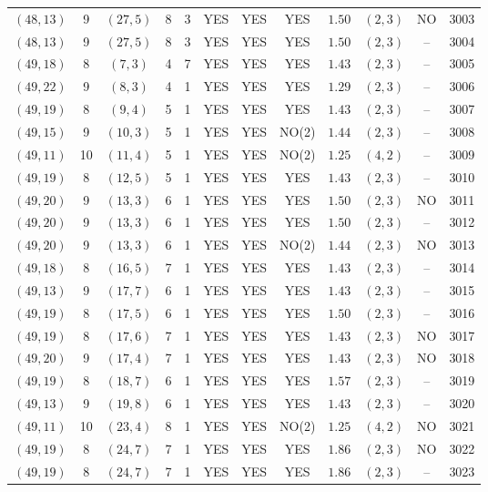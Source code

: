 \begin{longtable}{|c|c|c|c|c|c|c|c|c|c|c|c|}
$(48,13)$ & 9 & $(27,5)$ & 8 & 3 & YES & YES & YES & $1.50$ & $(2,3)$ & NO & 3003\\
$(48,13)$ & 9 & $(27,5)$ & 8 & 3 & YES & YES & YES & $1.50$ & $(2,3)$ & -- & 3004\\
$(49,18)$ & 8 & $(7,3)$ & 4 & 7 & YES & YES & YES & $1.43$ & $(2,3)$ & -- & 3005\\
$(49,22)$ & 9 & $(8,3)$ & 4 & 1 & YES & YES & YES & $1.29$ & $(2,3)$ & -- & 3006\\
$(49,19)$ & 8 & $(9,4)$ & 5 & 1 & YES & YES & YES & $1.43$ & $(2,3)$ & -- & 3007\\
$(49,15)$ & 9 & $(10,3)$ & 5 & 1 & YES & YES & NO(2) & $1.44$ & $(2,3)$ & -- & 3008\\
$(49,11)$ & 10 & $(11,4)$ & 5 & 1 & YES & YES & NO(2) & $1.25$ & $(4,2)$ & -- & 3009\\
$(49,19)$ & 8 & $(12,5)$ & 5 & 1 & YES & YES & YES & $1.43$ & $(2,3)$ & -- & 3010\\
$(49,20)$ & 9 & $(13,3)$ & 6 & 1 & YES & YES & YES & $1.50$ & $(2,3)$ & NO & 3011\\
$(49,20)$ & 9 & $(13,3)$ & 6 & 1 & YES & YES & YES & $1.50$ & $(2,3)$ & -- & 3012\\
$(49,20)$ & 9 & $(13,3)$ & 6 & 1 & YES & YES & NO(2) & $1.44$ & $(2,3)$ & NO & 3013\\
$(49,18)$ & 8 & $(16,5)$ & 7 & 1 & YES & YES & YES & $1.43$ & $(2,3)$ & -- & 3014\\
$(49,13)$ & 9 & $(17,7)$ & 6 & 1 & YES & YES & YES & $1.43$ & $(2,3)$ & -- & 3015\\
$(49,19)$ & 8 & $(17,5)$ & 6 & 1 & YES & YES & YES & $1.50$ & $(2,3)$ & -- & 3016\\
$(49,19)$ & 8 & $(17,6)$ & 7 & 1 & YES & YES & YES & $1.43$ & $(2,3)$ & NO & 3017\\
$(49,20)$ & 9 & $(17,4)$ & 7 & 1 & YES & YES & YES & $1.43$ & $(2,3)$ & NO & 3018\\
$(49,19)$ & 8 & $(18,7)$ & 6 & 1 & YES & YES & YES & $1.57$ & $(2,3)$ & -- & 3019\\
$(49,13)$ & 9 & $(19,8)$ & 6 & 1 & YES & YES & YES & $1.43$ & $(2,3)$ & -- & 3020\\
$(49,11)$ & 10 & $(23,4)$ & 8 & 1 & YES & YES & NO(2) & $1.25$ & $(4,2)$ & NO & 3021\\
$(49,19)$ & 8 & $(24,7)$ & 7 & 1 & YES & YES & YES & $1.86$ & $(2,3)$ & NO & 3022\\
$(49,19)$ & 8 & $(24,7)$ & 7 & 1 & YES & YES & YES & $1.86$ & $(2,3)$ & -- & 3023\\

\end{longtable}
